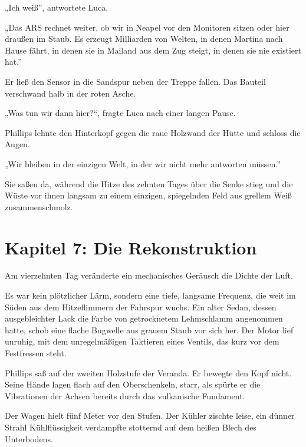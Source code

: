 \documentclass[
  ngerman,
]{article}
\begin{document}
„Ich weiß'', antwortete Luca.

„Das ARS rechnet weiter, ob wir in Neapel vor den Monitoren sitzen oder
hier draußen im Staub. Es erzeugt Milliarden von Welten, in denen
Martina nach Hause fährt, in denen sie in Mailand aus dem Zug steigt, in
denen sie nie existiert hat.''

Er ließ den Sensor in die Sandspur neben der Treppe fallen. Das Bauteil
verschwand halb in der roten Asche.

„Was tun wir dann hier?{\kern0pt}``, fragte Luca nach einer langen
Pause.

Phillips lehnte den Hinterkopf gegen die raue Holzwand der Hütte und
schloss die Augen.

„Wir bleiben in der einzigen Welt, in der wir nicht mehr antworten
müssen.''

Sie saßen da, während die Hitze des zehnten Tages über die Senke stieg
und die Wüste vor ihnen langsam zu einem einzigen, spiegelnden Feld aus
grellem Weiß zusammenschmolz.

\section{}\label{section-2}

\section{\texorpdfstring{\textbf{Kapitel 7: Die
Rekonstruktion}}{Kapitel 7: Die Rekonstruktion}}\label{kapitel-7-die-rekonstruktion}

Am vierzehnten Tag veränderte ein mechanisches Geräusch die Dichte der
Luft.

Es war kein plötzlicher Lärm, sondern eine tiefe, langsame Frequenz, die
weit im Süden aus dem Hitzeflimmern der Fahrspur wuchs. Ein alter Sedan,
dessen ausgebleichter Lack die Farbe von getrocknetem Lehmschlamm
angenommen hatte, schob eine flache Bugwelle aus grauem Staub vor sich
her. Der Motor lief unruhig, mit dem unregelmäßigen Taktieren eines
Ventils, das kurz vor dem Festfressen steht.

Phillips saß auf der zweiten Holzstufe der Veranda. Er bewegte den Kopf
nicht. Seine Hände lagen flach auf den Oberschenkeln, starr, als spürte
er die Vibrationen der Achsen bereits durch das vulkanische Fundament.

Der Wagen hielt fünf Meter vor den Stufen. Der Kühler zischte leise, ein
dünner Strahl Kühlflüssigkeit verdampfte stotternd auf dem heißen Blech
des Unterbodens.
\end{document}
